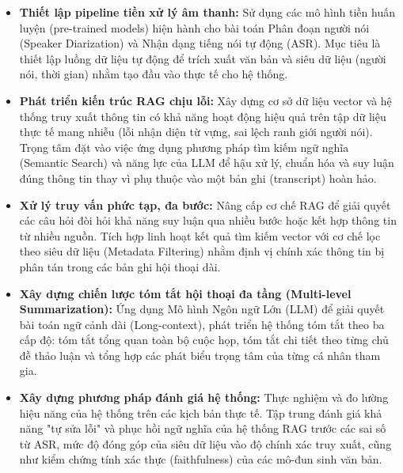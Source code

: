\begin{itemize}[label={}]

\item \textbf{Thiết lập pipeline tiền xử lý âm thanh:}
Sử dụng các mô hình tiền huấn luyện (pre-trained models) hiện hành cho bài toán Phân đoạn người nói (Speaker Diarization) và Nhận dạng tiếng nói tự động (ASR). Mục tiêu là thiết lập luồng dữ liệu tự động để trích xuất văn bản và siêu dữ liệu (người nói, thời gian) nhằm tạo đầu vào thực tế cho hệ thống.

\item \textbf{Phát triển kiến trúc RAG chịu lỗi:}
Xây dựng cơ sở dữ liệu vector và hệ thống truy xuất thông tin có khả năng hoạt động hiệu quả trên tập dữ liệu thực tế mang nhiễu (lỗi nhận diện từ vựng, sai lệch ranh giới người nói). Trọng tâm đặt vào việc ứng dụng phương pháp tìm kiếm ngữ nghĩa (Semantic Search) và năng lực của LLM để hậu xử lý, chuẩn hóa và suy luận đúng thông tin thay vì phụ thuộc vào một bản ghi (transcript) hoàn hảo.

\item \textbf{Xử lý truy vấn phức tạp, đa bước:}
Nâng cấp cơ chế RAG để giải quyết các câu hỏi đòi hỏi khả năng suy luận qua nhiều bước hoặc kết hợp thông tin từ nhiều nguồn. Tích hợp linh hoạt kết quả tìm kiếm vector với cơ chế lọc theo siêu dữ liệu (Metadata Filtering) nhằm định vị chính xác thông tin bị phân tán trong các bản ghi hội thoại dài.

\item \textbf{Xây dựng chiến lược tóm tắt hội thoại đa tầng (Multi-level Summarization):}
Ứng dụng Mô hình Ngôn ngữ Lớn (LLM) để giải quyết bài toán ngữ cảnh dài (Long-context), phát triển hệ thống tóm tắt theo ba cấp độ: tóm tắt tổng quan toàn bộ cuộc họp, tóm tắt chi tiết theo từng chủ đề thảo luận và tổng hợp các phát biểu trọng tâm của từng cá nhân tham gia.

\item \textbf{Xây dựng phương pháp đánh giá hệ thống:}
Thực nghiệm và đo lường hiệu năng của hệ thống trên các kịch bản thực tế. Tập trung đánh giá khả năng "tự sửa lỗi" và phục hồi ngữ nghĩa của hệ thống RAG trước các sai số từ ASR, mức độ đóng góp của siêu dữ liệu vào độ chính xác truy xuất, cũng như kiểm chứng tính xác thực (faithfulness) của các mô-đun sinh văn bản.

\end{itemize}